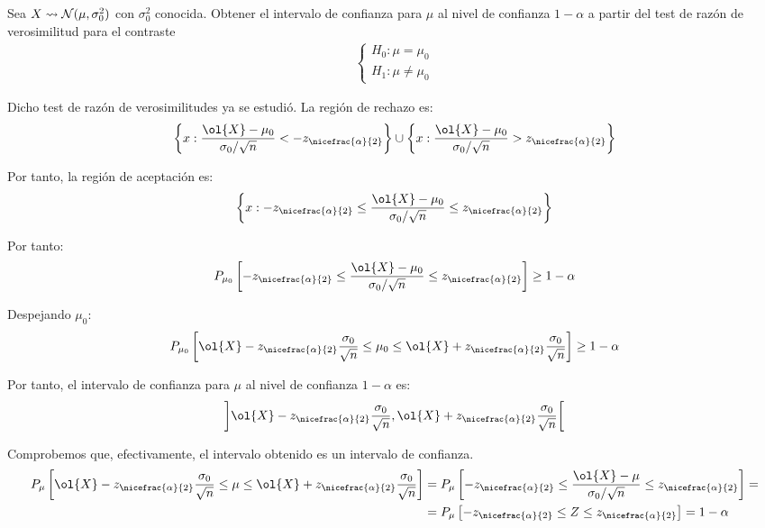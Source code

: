 \begin{ejercicio}
    Sea $X\rightsquigarrow \mathcal{N}(\mu, \sigma^2_0)$ con $\sigma^2_0$ conocida. Obtener el intervalo de confianza para $\mu$ al nivel de confianza $1-\alpha$ a partir del test de razón de verosimilitud para el contraste
    \begin{align*}
        \begin{cases}
            H_0: \mu = \mu_0 \\
            H_1: \mu \neq \mu_0
        \end{cases}
    \end{align*}

    Dicho test de razón de verosimilitudes ya se estudió. La región de rechazo es:
    \begin{equation*}
        \left\{x: \dfrac{\ol{X} - \mu_0}{\sigma_0/\sqrt{n}} < -z_{\nicefrac{\alpha}{2}}\right\} \cup \left\{x: \dfrac{\ol{X} - \mu_0}{\sigma_0/\sqrt{n}} > z_{\nicefrac{\alpha}{2}}\right\}
    \end{equation*}

    Por tanto, la región de aceptación es:
    \begin{equation*}
        \left\{x: -z_{\nicefrac{\alpha}{2}} \leq \dfrac{\ol{X} - \mu_0}{\sigma_0/\sqrt{n}} \leq z_{\nicefrac{\alpha}{2}}\right\}
    \end{equation*}

    Por tanto:
    \begin{align*}
        P_{\mu_0}\left[-z_{\nicefrac{\alpha}{2}} \leq \dfrac{\ol{X} - \mu_0}{\sigma_0/\sqrt{n}} \leq z_{\nicefrac{\alpha}{2}}\right] \geq 1 - \alpha
    \end{align*}

    Despejando $\mu_0$:
    \begin{align*}
        P_{\mu_0}\left[\ol{X} - z_{\nicefrac{\alpha}{2}}\dfrac{\sigma_0}{\sqrt{n}} \leq \mu_0 \leq \ol{X} + z_{\nicefrac{\alpha}{2}}\dfrac{\sigma_0}{\sqrt{n}}\right] \geq 1 - \alpha
    \end{align*}

    Por tanto, el intervalo de confianza para $\mu$ al nivel de confianza $1-\alpha$ es:
    \begin{align*}
        \left]\ol{X} - z_{\nicefrac{\alpha}{2}}\dfrac{\sigma_0}{\sqrt{n}}, \ol{X} + z_{\nicefrac{\alpha}{2}}\dfrac{\sigma_0}{\sqrt{n}}\right[
    \end{align*}

    Comprobemos que, efectivamente, el intervalo obtenido es un intervalo de confianza.
    \begin{align*}
        P_\mu\left[\ol{X} - z_{\nicefrac{\alpha}{2}}\dfrac{\sigma_0}{\sqrt{n}} \leq \mu \leq \ol{X} + z_{\nicefrac{\alpha}{2}}\dfrac{\sigma_0}{\sqrt{n}}\right] &= P_\mu\left[-z_{\nicefrac{\alpha}{2}} \leq \dfrac{\ol{X} - \mu}{\sigma_0/\sqrt{n}} \leq z_{\nicefrac{\alpha}{2}}\right] =\\&= P_\mu\left[-z_{\nicefrac{\alpha}{2}} \leq Z \leq z_{\nicefrac{\alpha}{2}}\right] = 1 - \alpha
    \end{align*}

\end{ejercicio}


